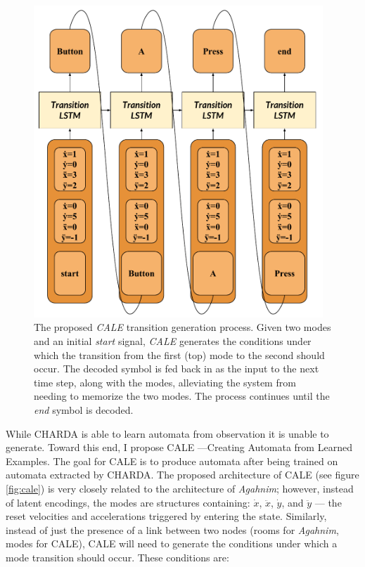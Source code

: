 \documentclass[12pt]{report}
\begin{document}
\begin{figure}[htbp!]
\centering
    \includegraphics[width=0.97\textwidth]{figures/CALE_Transition.pdf} 
   
    \caption{The proposed \textit{CALE} transition generation process. Given two modes and an initial \textit{start} signal, \textit{CALE} generates the conditions under which the transition from the first (top) mode to the second should occur. The decoded symbol is fed back in as the input to the next time step, along with the modes, alleviating the system from needing to memorize the two modes. The process continues until the \textit{end} symbol is decoded.}
  \label{fig:cale_transition}
  \end{figure}
While CHARDA is able to learn automata from observation it is unable to generate.  Toward this end, I propose CALE ---Creating Automata from Learned Examples.  The goal for CALE is to produce automata after being trained on automata extracted by CHARDA.  The proposed architecture of CALE (see figure \ref{fig:cale}) is very closely related to the architecture of \textit{Agahnim}; however, instead of latent encodings, the modes are structures containing: $\dot{x}$, $\ddot{x}$, $\dot{y}$, and $\ddot{y}$  --- the reset velocities and accelerations triggered by entering the state.  Similarly, instead of just the presence of a link between two nodes (rooms for \textit{Agahnim}, modes for CALE), CALE will need to generate the conditions under which a mode transition should occur.  These conditions are:
\end{document}
